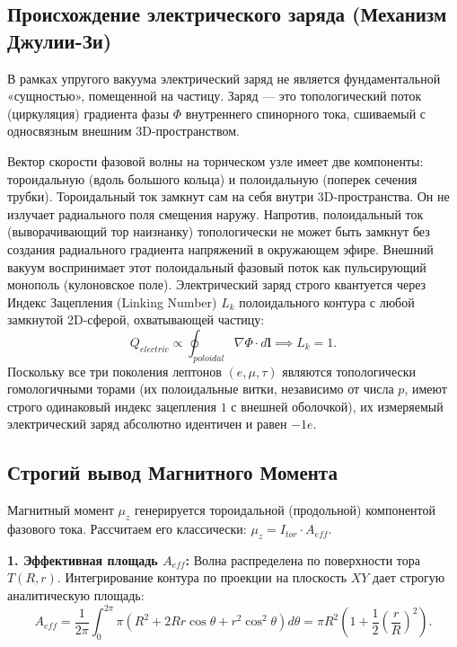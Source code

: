 \documentclass[11pt,a4paper]{article}
\begin{document}
\subsection{Происхождение электрического заряда (Механизм Джулии-Зи)}
В рамках упругого вакуума электрический заряд не является фундаментальной «сущностью», помещенной на частицу. Заряд — это топологический поток (циркуляция) градиента фазы $\Phi$ внутреннего спинорного тока, сшиваемый с односвязным внешним 3D-пространством.

Вектор скорости фазовой волны на торическом узле имеет две компоненты: тороидальную (вдоль большого кольца) и полоидальную (поперек сечения трубки). 
Тороидальный ток замкнут сам на себя внутри 3D-пространства. Он не излучает радиального поля смещения наружу. Напротив, полоидальный ток (выворачивающий тор наизнанку) топологически не может быть замкнут без создания радиального градиента напряжений в окружающем эфире. 
Внешний вакуум воспринимает этот полоидальный фазовый поток как пульсирующий монополь (кулоновское поле). Электрический заряд строго квантуется через Индекс Зацепления (Linking Number) $L_k$ полоидального контура с любой замкнутой 2D-сферой, охватывающей частицу:
\begin{equation}
	Q_{electric} \propto \oint_{poloidal} \nabla \Phi \cdot d\mathbf{l} \implies L_k = 1.
\end{equation}
Поскольку все три поколения лептонов $(e, \mu, \tau)$ являются топологически гомологичными торами (их полоидальные витки, независимо от числа $p$, имеют строго одинаковый индекс зацепления $1$ с внешней оболочкой), их измеряемый электрический заряд абсолютно идентичен и равен $-1e$.

\subsection{Строгий вывод Магнитного Момента}
Магнитный момент $\mu_z$ генерируется тороидальной (продольной) компонентой фазового тока. Рассчитаем его классически: $\mu_z = I_{tor} \cdot A_{eff}$.

\textbf{1. Эффективная площадь $A_{eff}$:}
Волна распределена по поверхности тора $T(R, r)$. Интегрирование контура по проекции на плоскость $XY$ дает строгую аналитическую площадь:
\begin{equation}
	A_{eff} = \frac{1}{2\pi} \int_0^{2\pi} \pi (R^2 + 2Rr\cos\theta + r^2\cos^2\theta) d\theta = \pi R^2 \left( 1 + \frac{1}{2} \left(\frac{r}{R}\right)^2 \right).
\end{equation}
\end{document}
